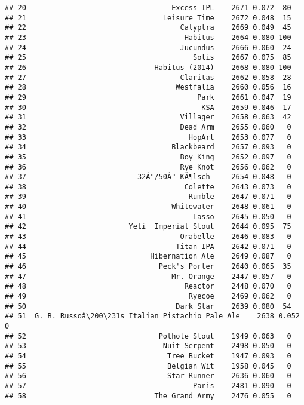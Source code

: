 \documentclass[
]{article}
\begin{document}
\begin{verbatim}
## 20                                  Excess IPL    2671 0.072  80
## 21                                Leisure Time    2672 0.048  15
## 22                                    Calyptra    2669 0.049  45
## 23                                     Habitus    2664 0.080 100
## 24                                    Jucundus    2666 0.060  24
## 25                                       Solis    2667 0.075  85
## 26                              Habitus (2014)    2668 0.080 100
## 27                                    Claritas    2662 0.058  28
## 28                                   Westfalia    2660 0.056  16
## 29                                        Park    2661 0.047  19
## 30                                         KSA    2659 0.046  17
## 31                                    Villager    2658 0.063  42
## 32                                    Dead Arm    2655 0.060   0
## 33                                      HopArt    2653 0.077   0
## 34                                  Blackbeard    2657 0.093   0
## 35                                    Boy King    2652 0.097   0
## 36                                    Rye Knot    2656 0.062   0
## 37                          32Â°/50Â° KÃ¶lsch     2654 0.048   0
## 38                                     Colette    2643 0.073   0
## 39                                      Rumble    2647 0.071   0
## 40                                  Whitewater    2648 0.061   0
## 41                                       Lasso    2645 0.050   0
## 42                        Yeti  Imperial Stout    2644 0.095  75
## 43                                    Orabelle    2646 0.083   0
## 44                                   Titan IPA    2642 0.071   0
## 45                             Hibernation Ale    2649 0.087   0
## 46                               Peck's Porter    2640 0.065  35
## 47                                  Mr. Orange    2447 0.057   0
## 48                                     Reactor    2448 0.070   0
## 49                                      Ryecoe    2469 0.062   0
## 50                                   Dark Star    2639 0.080  54
## 51  G. B. Russoâ\200\231s Italian Pistachio Pale Ale    2638 0.052   0
## 52                               Pothole Stout    1949 0.063   0
## 53                                Nuit Serpent    2498 0.050   0
## 54                                 Tree Bucket    1947 0.093   0
## 55                                 Belgian Wit    1958 0.045   0
## 56                                 Star Runner    2636 0.060   0
## 57                                       Paris    2481 0.090   0
## 58                              The Grand Army    2476 0.055   0

\end{verbatim}
\end{document}
